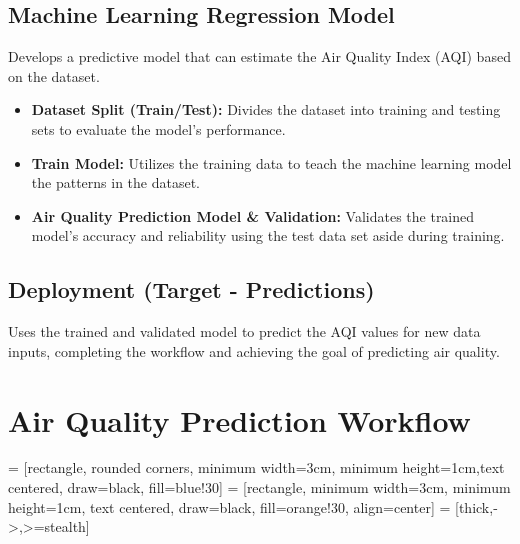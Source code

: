 	\subsection{Machine Learning Regression Model}
	 Develops a predictive model that can estimate the Air Quality Index (AQI) based on the dataset.
	\begin{itemize}
		\item \textbf{Dataset Split (Train/Test):} Divides the dataset into training and testing sets to evaluate the model's performance.
		\item \textbf{Train Model:} Utilizes the training data to teach the machine learning model the patterns in the dataset.
		\item \textbf{Air Quality Prediction Model \& Validation:} Validates the trained model's accuracy and reliability using the test data set aside during training.
	\end{itemize}
	
	\subsection{Deployment (Target - Predictions)}
     Uses the trained and validated model to predict the AQI values for new data inputs, completing the workflow and achieving the goal of predicting air quality\cite{Ravindiran:2023}.
	

	\section{Air Quality Prediction Workflow}
	 = [rectangle, rounded corners, minimum width=3cm, minimum height=1cm,text centered, draw=black, fill=blue!30]
	 = [rectangle, minimum width=3cm, minimum height=1cm, text centered, draw=black, fill=orange!30, align=center]
	 = [thick,->,>=stealth]
	
